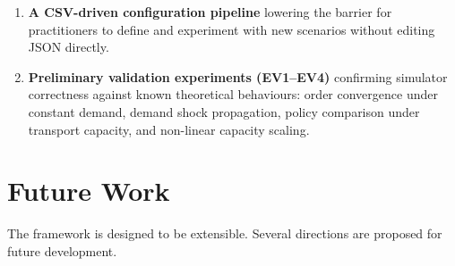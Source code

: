 \begin{enumerate}
  \item \textbf{A CSV-driven configuration pipeline} lowering the
        barrier for practitioners to define and experiment with new
        scenarios without editing JSON directly.

  \item \textbf{Preliminary validation experiments (EV1--EV4)}
        confirming simulator correctness against known theoretical
        behaviours: order convergence under constant demand, demand
        shock propagation, policy comparison under transport
        capacity, and non-linear capacity scaling.
\end{enumerate}

\section{Future Work}
\label{sec:conc:futurework}

The framework is designed to be extensible.  Several directions are
proposed for future development.

